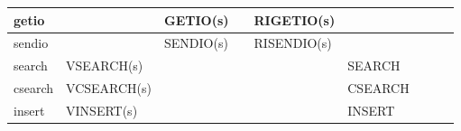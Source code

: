 {{\begin{longtable}{|p{7mm}|p{16.5mm}|p{12mm}|l|l|l|l|l|l|}
getio     &            & GETIO(s)  &            & RIGETIO(s)  &         &          &          &           \\ \hline
sendio    &            & SENDIO(s) &            & RISENDIO(s) &         &          &          &           \\ \hline
search    & VSEARCH(s) &           &            &             & SEARCH  &          &          &           \\ \hline
csearch   & VCSEARCH(s)&           &            &             & CSEARCH &          &          &           \\ \hline
insert    & VINSERT(s) &           &            &             & INSERT  &          &          &           \\ \hline
\end{longtable}
}}


